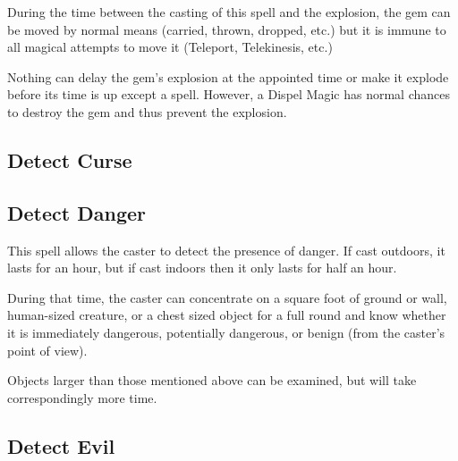 \begin{multicols*}{2}
During the time between the casting of this spell and the explosion, the gem can be moved by normal means (carried, thrown, dropped, etc.) but it is immune to all magical attempts to move it (Teleport, Telekinesis, etc.)

Nothing can delay the gem’s explosion at the appointed time or make it explode before its time is up except a  spell. However, a Dispel Magic has normal chances to destroy the gem and thus prevent the explosion.

\subsection{Detect Curse}\label{spell:Detect Curse}


\subsection{Detect Danger}\label{spell:Detect Danger}

This spell allows the caster to detect the presence of danger. If cast outdoors, it lasts for an hour, but if cast indoors then it only lasts for half an hour.

During that time, the caster can concentrate on a square foot of ground or wall, human-sized creature, or a chest sized object for a full round and know whether it is immediately dangerous, potentially dangerous, or benign (from the caster’s point of view).

Objects larger than those mentioned above can be examined, but will take correspondingly more time.

\subsection{Detect Evil}\label{spell:Detect Evil}
\end{multicols*}

